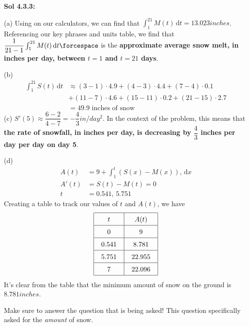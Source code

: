 \begin{tcolorbox}[solution]
    \textbf{Sol 4.3.3: } \par
    (a) Using   on our calculators, we can find that $\int_1^{21} M(t) \,\mathrm{d}t = \boxed{13.023 \si{inches}}$. Referencing our key phrases and units table, we find that $\dfrac{1}{21 - 1}\int_1^{21} M(t) \,\mathrm{d}t \forcespace$ is the \textbf{approximate average snow melt, in inches per day, between $t = 1$ and $t = 21$ days}. \par
    \vspace{11pt}
    (b) \begin{align*}
        \int_1^{21} S(t) \,\mathrm{d}t &\approx (3 - 1) \cdot 4.9 + (4 - 3) \cdot 4.4 + (7 - 4) \cdot 0.1 \\[5.5pt]
        & + (11 - 7) \cdot 4.6 + (15 - 11) \cdot 0.2 + (21 - 15) \cdot 2.7 \\[11pt]
        &= \boxed{49.9 \text{ inches of snow}}
    \end{align*}
    (c) $S'(5) \approx \dfrac{6 - 2}{4 - 7} = \boxed{-\dfrac{4}{3} \si{in \per day^2}}$. In the context of the problem, this means that \textbf{the rate of snowfall, in inches per day, is decreasing by $\dfrac{4}{3}$ inches per day per day on day 5}. \par
    \vspace{11pt}
    (d) \begin{align*}
        A(t) &= 9 + \int_1^t (S(x) - M(x)) , \,\mathrm{d}x \\[11pt]
        A'(t) &= S(t) - M(t) = 0 \\[11pt]
        t &= 0.541, \, 5.751
    \end{align*}
    Creating a table to track our values of $t$ and $A(t)$, we have \begin{align*}
        \arraycolsep=11pt\def\arraystretch{1.5}
        \begin{array}{|c|c|}
            \hline
            t & A(t) \\ \hline
            0 & 9 \\ \hline
            0.541 & 8.781 \\ \hline
            5.751 & 22.955 \\ \hline
            7 & 22.096 \\
            \hline
        \end{array}
    \end{align*}
    It's clear from the table that the minimum amount of snow on the ground is $\boxed{8.781 \si{inches}}$. \par
    \vspace{11pt}
    Make sure to answer the question that is being asked! This question specifically asked for the \textit{amount} of snow.
\end{tcolorbox}

